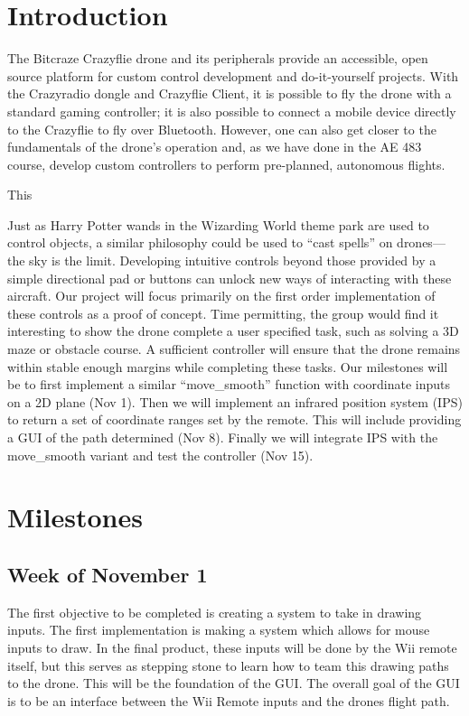 \documentclass[conf]{new-aiaa}
\begin{document}
\section{Introduction}
The Bitcraze Crazyflie drone and its peripherals provide an accessible, open source platform for custom control development and do-it-yourself projects. \cite{crazyflie} With the Crazyradio dongle and Crazyflie Client, it is possible to fly the drone with a standard gaming controller; it is also possible to connect a mobile device directly to the Crazyflie to fly over Bluetooth. However, one can also get closer to the fundamentals of the drone's operation and, as we have done in the AE 483 course, develop custom controllers to perform pre-planned, autonomous flights.

This 

    Just as Harry Potter wands in the Wizarding World theme park are used to control objects, a similar philosophy could be used to “cast spells” on drones—the sky is the limit.  Developing intuitive controls beyond those provided by a simple directional pad or buttons can unlock new ways of interacting with these aircraft. Our project will focus primarily on the first order implementation of these controls as a proof of concept. Time permitting, the group would find it interesting to show the drone complete a user specified task, such as solving a 3D maze or obstacle course. A sufficient controller will ensure that the drone remains within stable enough margins while completing these tasks. Our milestones will be to first implement a similar “move\_smooth”  function with coordinate inputs on a 2D plane (Nov 1). Then  we will implement an infrared position system (IPS) to return a set of coordinate ranges set by the remote. This will include providing a GUI of the path determined (Nov 8). Finally we will  integrate IPS with the move\_smooth variant and test the controller (Nov 15).

\section{Milestones}

    \subsection{Week of November 1}
    
        The first objective to be completed is creating a system to take in drawing inputs. The first implementation is making a system which allows for mouse inputs to draw. In the final product, these inputs will be done by the Wii remote itself, but this serves as stepping stone to learn how to team this drawing paths to the drone. This will be the foundation of the GUI. The overall goal of the GUI is to be an interface between the Wii Remote inputs and the drones flight path. 
        
\end{document}
